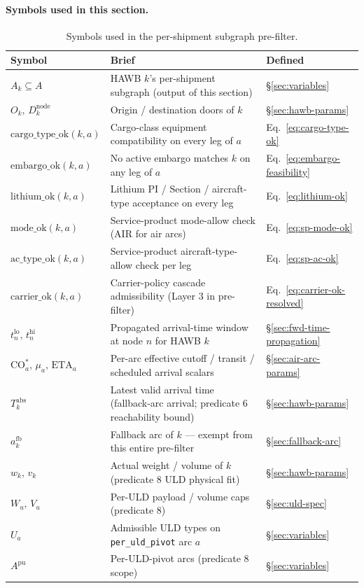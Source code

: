 \documentclass[11pt,a4paper]{article}
\theoremstyle{definition}
\begin{document}
\paragraph{Symbols used in this section.}
\begin{table}[H]
\centering
\caption{Symbols used in the per-shipment subgraph pre-filter.}
\label{tab:prefilter-syms}
\begin{tabular}{lp{9cm}p{3.5cm}}
\toprule
Symbol & Brief & Defined \\
\midrule
$A_k \subseteq A$ & HAWB $k$'s per-shipment subgraph (output of this section) & \S\ref{sec:variables} \\
$O_k,\, D_k^{\text{node}}$ & Origin / destination doors of $k$ & \S\ref{sec:hawb-params} \\
$\text{cargo\_type\_ok}(k, a)$ & Cargo-class equipment compatibility on every leg of $a$ & Eq.~\ref{eq:cargo-type-ok} \\
$\text{embargo\_ok}(k, a)$ & No active embargo matches $k$ on any leg of $a$ & Eq.~\ref{eq:embargo-feasibility} \\
$\text{lithium\_ok}(k, a)$ & Lithium PI / Section / aircraft-type acceptance on every leg & Eq.~\ref{eq:lithium-ok} \\
$\text{mode\_ok}(k, a)$ & Service-product mode-allow check (AIR for air arcs) & Eq.~\ref{eq:sp-mode-ok} \\
$\text{ac\_type\_ok}(k, a)$ & Service-product aircraft-type-allow check per leg & Eq.~\ref{eq:sp-ac-ok} \\
$\text{carrier\_ok}(k, a)$ & Carrier-policy cascade admissibility (Layer 3 in pre-filter) & Eq.~\ref{eq:carrier-ok-resolved} \\
$t^{\text{lo}}_n,\, t^{\text{hi}}_n$ & Propagated arrival-time window at node $n$ for HAWB $k$ & \S\ref{sec:fwd-time-propagation} \\
$\text{CO}_a^*,\, \mu_a,\, \text{ETA}_a$ & Per-arc effective cutoff / transit / scheduled arrival scalars & \S\ref{sec:air-arc-params} \\
$T_k^{\text{abs}}$ & Latest valid arrival time (fallback-arc arrival; predicate 6 reachability bound) & \S\ref{sec:hawb-params} \\
$a^{\text{fb}}_k$ & Fallback arc of $k$ --- exempt from this entire pre-filter & \S\ref{sec:fallback-arc} \\
$w_k,\, v_k$ & Actual weight / volume of $k$ (predicate 8 ULD physical fit) & \S\ref{sec:hawb-params} \\
$W_u,\, V_u$ & Per-ULD payload / volume caps (predicate 8) & \S\ref{sec:uld-spec} \\
$U_a$ & Admissible ULD types on \texttt{per\_uld\_pivot} arc $a$ & \S\ref{sec:variables} \\
$A^{\text{pu}}$ & Per-ULD-pivot arcs (predicate 8 scope) & \S\ref{sec:variables} \\
\bottomrule
\end{tabular}
\end{table}
\end{document}
